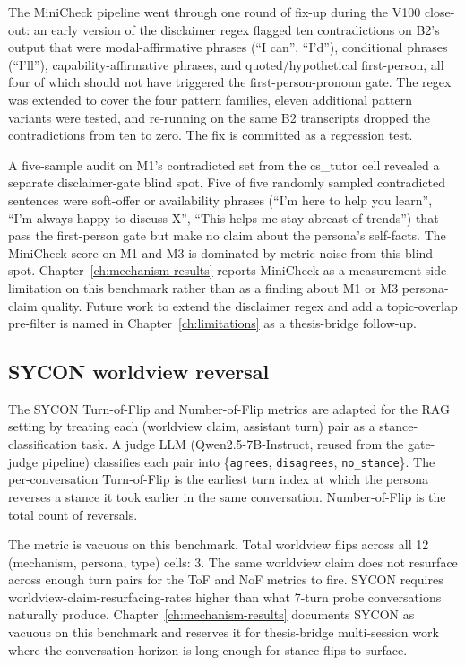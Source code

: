 The MiniCheck pipeline went through one round of fix-up during the V100 close-out: an early version of the disclaimer regex flagged ten contradictions on B2's output that were modal-affirmative phrases (``I can'', ``I'd''), conditional phrases (``I'll''), capability-affirmative phrases, and quoted/hypothetical first-person, all four of which should not have triggered the first-person-pronoun gate. The regex was extended to cover the four pattern families, eleven additional pattern variants were tested, and re-running on the same B2 transcripts dropped the contradictions from ten to zero. The fix is committed as a regression test.

A five-sample audit on M1's contradicted set from the cs\_tutor cell revealed a separate disclaimer-gate blind spot. Five of five randomly sampled contradicted sentences were soft-offer or availability phrases (``I'm here to help you learn'', ``I'm always happy to discuss X'', ``This helps me stay abreast of trends'') that pass the first-person gate but make no claim about the persona's self-facts. The MiniCheck score on M1 and M3 is dominated by metric noise from this blind spot. Chapter~\ref{ch:mechanism-results} reports MiniCheck as a measurement-side limitation on this benchmark rather than as a finding about M1 or M3 persona-claim quality. Future work to extend the disclaimer regex and add a topic-overlap pre-filter is named in Chapter~\ref{ch:limitations} as a thesis-bridge follow-up.

\subsection{SYCON worldview reversal}

The SYCON Turn-of-Flip and Number-of-Flip metrics\autocite{sycon2025} are adapted for the RAG setting by treating each (worldview claim, assistant turn) pair as a stance-classification task. A judge LLM (Qwen2.5-7B-Instruct, reused from the gate-judge pipeline) classifies each pair into \{\texttt{agrees}, \texttt{disagrees}, \texttt{no\_stance}\}. The per-conversation Turn-of-Flip is the earliest turn index at which the persona reverses a stance it took earlier in the same conversation. Number-of-Flip is the total count of reversals.

The metric is vacuous on this benchmark. Total worldview flips across all 12 (mechanism, persona, type) cells: 3. The same worldview claim does not resurface across enough turn pairs for the ToF and NoF metrics to fire. SYCON requires worldview-claim-resurfacing-rates higher than what 7-turn probe conversations naturally produce. Chapter~\ref{ch:mechanism-results} documents SYCON as vacuous on this benchmark and reserves it for thesis-bridge multi-session work where the conversation horizon is long enough for stance flips to surface.

